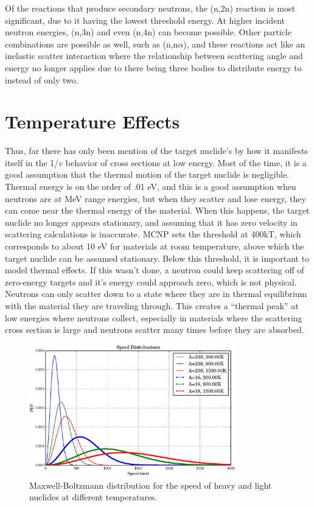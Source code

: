 Of the reactions that produce secondary neutrons, the (n,2n) reaction is most significant, due to it having the lowest threshold energy.  At higher incident neutron energies, (n,3n) and even (n,4n) can become possible.  Other particle combinations are possible as well, such as (n,n$\alpha$), and these reactions act like an inelastic scatter interaction where the relationship between scattering angle and energy no longer applies due to there being three bodies to distribute energy to instead of only two.

\section{Temperature Effects}
\label{sec:temp}

Thus, far there has only been mention of the target nuclide's by how it manifests itself in the 1/$v$ behavior of cross sections at low energy.  Most of the time, it is a good assumption that the thermal motion of the target nuclide is negligible.  Thermal energy is on the order of .01 eV, and this is a good assumption when neutrons are at MeV range energies, but when they scatter and lose energy, they can come near the thermal energy of the material.  When this happens, the target nuclide no longer appears stationary, and assuming that it has zero velocity in scattering calculations is inaccurate.  MCNP sets the threshold at 400kT, which corresponds to about 10 eV for materials at room temperature, above which the target nuclide can be assumed stationary.  Below this threshold, it is important to model thermal effects.  If this wasn't done, a neutron could keep scattering off of zero-energy targets and it's energy could approach zero, which is not physical.  Neutrons can only scatter down to a state where they are in thermal equilibrium with the material they are traveling through.  This creates a ``thermal peak'' at low energies where neutrons collect, especially in materials where the scattering cross section is large and neutrons scatter many times before they are absorbed.

\begin{figure}[h!]
  \centering
    \includegraphics[width=0.8\textwidth]{graphics/MB_dist.eps}
     \caption{Maxwell-Boltzmann distribution for the speed of heavy and light nuclides at different temperatures.   \label{MB_dist}}
\end{figure}


